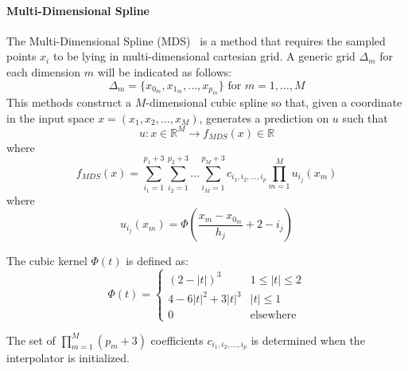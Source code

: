 \paragraph{Multi-Dimensional Spline}
\label{sec:ND_spline}
The Multi-Dimensional Spline (MDS)~\cite{MD_spline} is a method that requires the sampled points $x_i$ to be lying in multi-dimensional cartesian grid.
A generic grid $\Delta_m$ for each dimension $m$ will be indicated as follows:
\begin{equation}
\Delta_m = \{x_{0_m},x_{1_m},\ldots,x_{p_m}\} \text{ for } m=1,\ldots,M
\end{equation}
This methods construct a $M$-dimensional cubic spline so that, given a coordinate in the input space $x=(x_1,x_2,\ldots,x_M)$, generates a prediction on $u$ such that 
\begin{equation}
u:x \in \mathbb{R}^M \rightarrow f_{MDS}(x) \in \mathbb{R}
\end{equation}
where
\begin{equation}
f_{MDS}(x)=\sum_{i_1=1}^{p_1+3} \sum_{i_2=1}^{p_2+3} \ldots \sum_{i_M=1}^{p_M+3} c_{i_1,i_2,\ldots,i_p} \prod_{m=1}^{M} u_{i_j} (x_m)
\end{equation}
where 
\begin{equation}
u_{i_j} (x_m) = \Phi\left ( \frac{x_m-x_{0_m}}{h_j}+2-i_j  \right )
\end{equation}

The cubic kernel $\Phi(t)$ is defined as:
\begin{equation}
\Phi(t) = \left\{\begin{matrix}
(2-\left | t \right |)^3 & 1\leq \left | t \right |\leq 2 \\
4-6\left | t \right |^2+3\left | t \right |^3 & \left | t \right |\leq 1\\ 
0 & \text{elsewhere}
\end{matrix}\right.
\end{equation}

The set of $\prod_{m=1}^{M}(p_m+3)$ coefficients $c_{i_1,i_2,\ldots,i_p}$  is determined when the interpolator is initialized.


